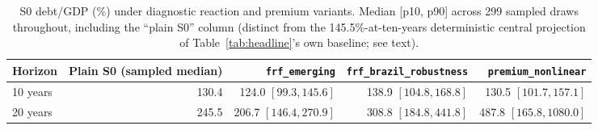 \documentclass[11pt,a4paper]{article}
\begin{document}
\begin{table}[htbp]
\centering\small
\caption{\textsc{S0} debt/GDP (\%) under diagnostic reaction and premium variants. Median [p10, p90] across 299 sampled draws throughout, including the ``plain \textsc{S0}'' column (distinct from the 145.5\%-at-ten-years deterministic central projection of Table~\ref{tab:headline}'s own baseline; see text).}
\label{tab:d4variants}
\begin{tabular}{lrrrr}
\toprule
Horizon & Plain \textsc{S0} (sampled median) & \texttt{frf\_emerging} & \texttt{frf\_brazil\_robustness} & \texttt{premium\_nonlinear} \\
\midrule
10 years & 130.4 & 124.0 $[99.3,145.6]$ & 138.9 $[104.8,168.8]$ & 130.5 $[101.7,157.1]$ \\
20 years & 245.5 & 206.7 $[146.4,270.9]$ & 308.8 $[184.8,441.8]$ & 487.8 $[165.8,1080.0]$ \\
\bottomrule
\end{tabular}
\end{table}
\end{document}
